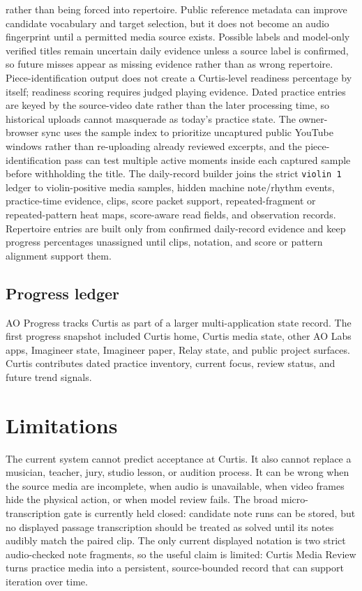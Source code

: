 \documentclass[12pt,letterpaper]{article}
\begin{document}
rather than being forced into repertoire. Public reference metadata can improve candidate vocabulary and target selection, but it does not become an audio fingerprint until a permitted media source exists. Possible labels and model-only verified titles remain uncertain daily evidence unless a source label is confirmed, so future misses appear as missing evidence rather than as wrong repertoire. Piece-identification output does not create a Curtis-level readiness percentage by itself; readiness scoring requires judged playing evidence. Dated practice entries are keyed by the source-video date rather than the later processing time, so historical uploads cannot masquerade as today's practice state. The owner-browser sync uses the sample index to prioritize uncaptured public YouTube windows rather than re-uploading already reviewed excerpts, and the piece-identification pass can test multiple active moments inside each captured sample before withholding the title. The daily-record builder joins the strict \texttt{violin 1} ledger to violin-positive media samples, hidden machine note/rhythm events, practice-time evidence, clips, score packet support, repeated-fragment or repeated-pattern heat maps, score-aware read fields, and observation records. Repertoire entries are built only from confirmed daily-record evidence and keep progress percentages unassigned until clips, notation, and score or pattern alignment support them.

\subsection*{Progress ledger}

AO Progress tracks Curtis as part of a larger multi-application state record. The first progress snapshot included Curtis home, Curtis media state, other AO Labs apps, Imagineer state, Imagineer paper, Relay state, and public project surfaces. Curtis contributes dated practice inventory, current focus, review status, and future trend signals.

\section{Limitations}

The current system cannot predict acceptance at Curtis. It also cannot replace a musician, teacher, jury, studio lesson, or audition process. It can be wrong when the source media are incomplete, when audio is unavailable, when video frames hide the physical action, or when model review fails. The broad micro-transcription gate is currently held closed: candidate note runs can be stored, but no displayed passage transcription should be treated as solved until its notes audibly match the paired clip. The only current displayed notation is two strict audio-checked note fragments, so the useful claim is limited: Curtis Media Review turns practice media into a persistent, source-bounded record that can support iteration over time.

\printbibliography[title={References}]
\end{document}
